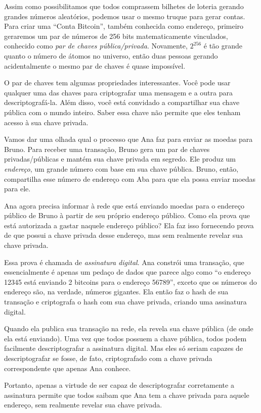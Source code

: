Assim como possibilitamos que todos comprassem bilhetes de loteria gerando grandes números aleatórios, podemos usar o mesmo truque para gerar contas. Para criar uma “Conta Bitcoin”, também conhecida como endereço, primeiro geraremos um par de números de 256 bits matematicamente vinculados, conhecido como \textit{par de chaves pública/privada}. Novamente, \(2^{256}\) é tão grande quanto o número de átomos no universo, então duas pessoas gerando acidentalmente o mesmo par de chaves é quase impossível.

O par de chaves tem algumas propriedades interessantes. Você pode usar qualquer uma das chaves para criptografar uma mensagem e a outra para descriptografá-la. Além disso, você está convidado a compartilhar sua chave pública com o mundo inteiro. Saber essa chave não permite que eles tenham acesso à sua chave privada.

Vamos dar uma olhada qual o processo que Ana faz para enviar as moedas para Bruno. Para receber uma transação, Bruno gera um par de chaves privadas/públicas e mantém sua chave privada em segredo. Ele produz um \textit{endereço}, um grande número com base em sua chave pública. Bruno, então, compartilha esse número de endereço com Aba para que ela possa enviar moedas para ele.

Ana agora precisa informar à rede que está enviando moedas para o endereço público de Bruno à partir de seu próprio endereço público. Como ela prova que está autorizada a gastar naquele endereço público? Ela faz isso fornecendo prova de que possui a chave privada desse endereço, mas sem realmente revelar sua chave privada.

Essa prova é chamada de \textit{assinatura digital}. Ana constrói uma transação, que essencialmente é apenas um pedaço de dados que parece algo como “o endereço 12345 está enviando 2 bitcoins para o endereço 56789”, exceto que os números do endereço são, na verdade, números gigantes. Ela então faz o hash de sua transação e criptografa o hash com sua chave privada, criando uma assinatura digital.

Quando ela publica sua transação na rede, ela revela sua chave pública (de onde ela está enviando). Uma vez que todos possuem a chave pública, todos podem facilmente descriptografar a assinatura digital. Mas eles só seriam capazes de descriptografar se fosse, de fato, criptografado com a chave privada correspondente que apenas Ana conhece.

Portanto, apenas a virtude de ser capaz de descriptografar corretamente a assinatura permite que todos saibam que Ana tem a chave privada para aquele endereço, sem realmente revelar sua chave privada.

